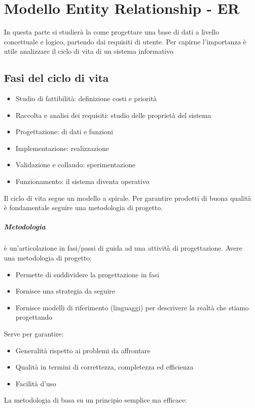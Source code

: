 \chapter{Modello Entity Relationship - ER}
In questa parte si studierà la come progettare una base di dati a livello concettuale
e logico, partendo dai requisiti di utente.
Per capirne l'importanza è utile analizzare il ciclo di vita di un sistema informativo
\section{Fasi del ciclo di vita}
\begin{itemize}
    \item Studio di fattibilità: definizione costi e priorità
    \item Raccolta e analisi dei requisiti: studio delle proprietà del sistema
    \item Progettazione: di dati e funzioni
    \item Implementazione: realizzazione
    \item Validazione e collaudo: sperimentazione
    \item Funzionamento: il sistema diventa operativo
\end{itemize}
Il ciclo di vita segue un modello a spirale.
Per garantire prodotti di buona qualità è fondamentale seguire una metodologia
di progetto.
\paragraph*{Metodologia} è un'articolazione in fasi/passi di guida ad una attività di
progettazione.
Avere una metodologia di progetto:
\begin{itemize}
    \item Permette di suddividere la progettazione in fasi
    \item Fornisce una strategia da seguire
    \item Fornisce modelli di riferimento (linguaggi) per descrivere la realtà
    che stiamo progettando
\end{itemize}
Serve per garantire:
\begin{itemize}
    \item Generalità rispetto ai problemi da affrontare
    \item Qualità in termini di correttezza, completezza ed efficienza
    \item Facilità d'uso
\end{itemize}
La metodologia di basa su un principio semplice ma efficace:

